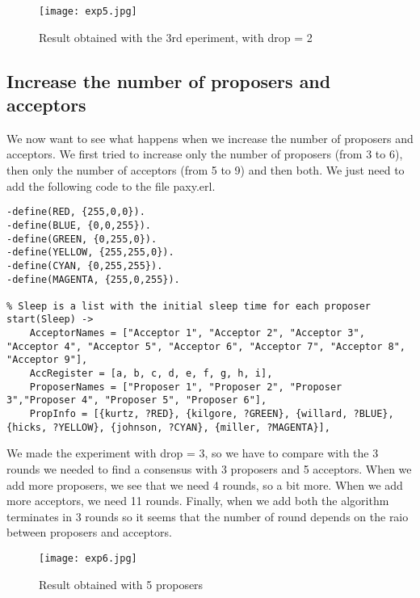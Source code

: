 \documentclass[a4paper, 11pt]{article}
\begin{document}
\begin{figure}[h!]
\begin{center}
\hspace*{-1in}
\texttt{[image: exp5.jpg]}
\caption{Result obtained with the 3rd eperiment, with drop = 2}
\end{center}
\end{figure}



\subsection{Increase the number of proposers and acceptors}
We now want to see what happens when we increase the number of proposers and acceptors. We first tried to increase only the number of proposers (from 3 to 6), then only the number of acceptors (from 5 to 9) and then both. We just need to add the following code to the file paxy.erl.
\begin{lstlisting}
-define(RED, {255,0,0}).
-define(BLUE, {0,0,255}).
-define(GREEN, {0,255,0}).
-define(YELLOW, {255,255,0}).
-define(CYAN, {0,255,255}).
-define(MAGENTA, {255,0,255}).

% Sleep is a list with the initial sleep time for each proposer
start(Sleep) ->
    AcceptorNames = ["Acceptor 1", "Acceptor 2", "Acceptor 3", "Acceptor 4", "Acceptor 5", "Acceptor 6", "Acceptor 7", "Acceptor 8", "Acceptor 9"],
    AccRegister = [a, b, c, d, e, f, g, h, i],
    ProposerNames = ["Proposer 1", "Proposer 2", "Proposer 3","Proposer 4", "Proposer 5", "Proposer 6"],
    PropInfo = [{kurtz, ?RED}, {kilgore, ?GREEN}, {willard, ?BLUE}, {hicks, ?YELLOW}, {johnson, ?CYAN}, {miller, ?MAGENTA}],
\end{lstlisting}
We made the experiment with drop = 3, so we have to compare with the 3 rounds we needed to find a consensus with 3 proposers and 5 acceptors. When we add more proposers, we see that we need 4 rounds, so a bit more. When we add more acceptors, we need 11 rounds. Finally, when we add both the algorithm terminates in 3 rounds so it seems that the number of round depends on the raio between proposers and acceptors.
\begin{figure}[h!]
\begin{center}
\hspace*{-1in}
\texttt{[image: exp6.jpg]}
\caption{Result obtained with 5 proposers}
\end{center}
\end{figure}
\end{document}
